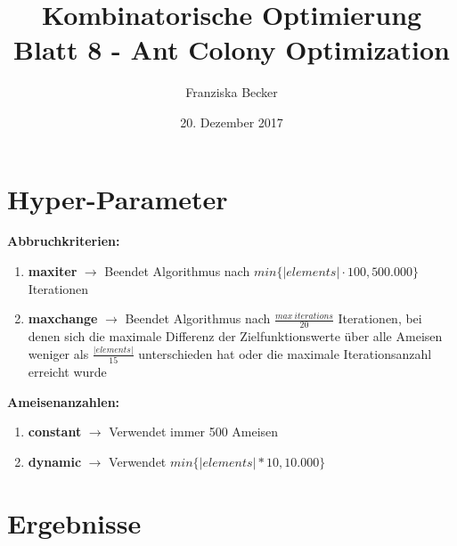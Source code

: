 \documentclass[a4paper]{article}
\title{\vspace{-1.5cm}Kombinatorische Optimierung Blatt 8 - Ant Colony Optimization}
\author{Franziska Becker}
\date{20. Dezember 2017}
\begin{document}
\maketitle

\section{Hyper-Parameter}

\textbf{Abbruchkriterien:}

\begin{enumerate}
  \item \hspace{5.5mm}\textbf{maxiter} \(\rightarrow\) Beendet Algorithmus nach \(min\{ |elements| \cdot 100, 500.000\}\) Iterationen
    \item \textbf{maxchange} \(\rightarrow\) Beendet Algorithmus nach \(\frac{max~iterations}{20}\) Iterationen, bei denen sich die maximale Differenz der Zielfunktionswerte über alle Ameisen weniger als \(\frac{|elements|}{15}\) unterschieden hat oder die maximale Iterationsanzahl erreicht wurde
\end{enumerate}

\textbf{Ameisenanzahlen:}

\begin{enumerate}
  \item \textbf{constant} \(\rightarrow\) Verwendet immer 500 Ameisen
    \item \textbf{dynamic} \(\rightarrow\) Verwendet \(min\{ |elements| * 10, 10.000\}\)
\end{enumerate}

\section{Ergebnisse}
\end{document}
